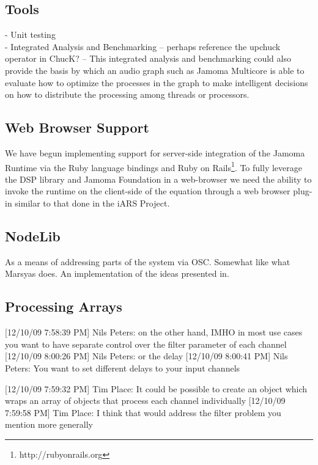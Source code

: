 \documentclass[twoside,10pt]{article}
\begin{document}
\subsection{Tools}

- Unit testing      \\

- Integrated Analysis and Benchmarking -- perhaps reference the upchuck operator in ChucK?
   -- This integrated analysis and benchmarking could also provide the basis by which an audio graph such as Jamoma Multicore is able to evaluate how to optimize the processes in the graph to make intelligent decisions on how to distribute the processing among threads or processors.


\subsection{Web Browser Support}
We have begun implementing support for server-side integration of the Jamoma Runtime via the Ruby language bindings and Ruby on Rails\footnote{http://rubyonrails.org}.  To fully leverage the DSP library and Jamoma Foundation in a web-browser we need the ability to invoke the runtime on the client-side of the equation through a web browser plug-in similar to that done in the iARS Project\cite{Frauenberger:2003}.

\subsection{NodeLib}

As a means of addressing parts of the system via OSC.  Somewhat like what Marsyas does.  An implementation of the ideas presented in\cite{Place:2008osc}.

\subsection{Processing Arrays}
[12/10/09 7:58:39 PM] Nils Peters: on the other hand, IMHO in most use cases you want to have separate control over the filter parameter of each channel
[12/10/09 8:00:26 PM] Nils Peters: or the delay
[12/10/09 8:00:41 PM] Nils Peters: You want to set different delays to your input channels

[12/10/09 7:59:32 PM] Tim Place: It could be possible to create an object which wraps an array of objects that process each channel individually
[12/10/09 7:59:58 PM] Tim Place: I think that would address the filter problem you mention more generally
\end{document}
